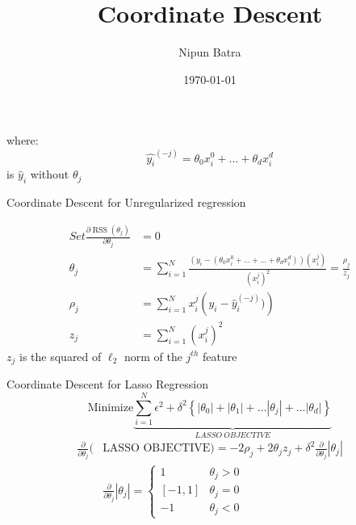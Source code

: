 \documentclass{beamer}
\title{Coordinate Descent}
\date{\today}
\author{Nipun Batra}
\institute{IIT Gandhinagar}
\begin{document}
  \maketitle


\begin{frame}where: $$\hat{y_{i}}^{(-j)} = \theta_{0} x_{i}^{0}+\ldots + \theta_{d} x_{i}^{d}$$ is $\hat{y}_{i}$ without $\theta_{j}$
\end{frame}

\begin{frame}{Coordinate Descent for Unregularized regression}

\begin{align*}
	Set \frac{\partial \operatorname{RSS}\left(\theta_{j}\right)}{\partial \theta_{j}}&= 0\\
    \theta_{j}&=\sum_{i=1}^{N} \frac{\left(y_{i}-\left(\theta_{0} x_{i}^{0}+\ldots + \ldots + \theta_{d}
    x_{i}^{d}\right)\right)\left(x_{i}^{j}\right)}{\left(x_{i}^{j}\right)^{2}}= \frac{\rho_{j}}{z_{j}}\\
    \rho_{j} &=\sum_{i=1}^{N} x_{i}^{j}\left(y_{i}-{\hat{y}_{i}^{(-j)}})\right)\\
    z_{j}&=\sum_{i=1}^{N}\left(x_{i}^{j}\right)^{2}
\end{align*}
$z_{j}$ is the squared of $\ell_2$ norm of the $j^{th}$ feature
\end{frame}

{
	
}

\begin{frame}{Coordinate Descent for Lasso Regression}
\[
  \text{Minimize} \underbrace{\sum_{i=1}^{N} \epsilon^{2} + \delta^{2}\left\{\left|\theta_{0}\right|+\left|\theta_{1}\right|+\ldots\left|\theta_{j}\right|+\ldots |\theta_{d}|\right\}}_{LASSO \: OBJECTIVE}
\]
\begin{align*}
\frac{\partial}{\partial \theta_{j}}(& \text {LASSO OBJECTIVE})=-2 \rho_{j}+2 \theta_{j} z_{j}+\delta^{2}{\frac{\partial}{\partial \theta_{j}}}\left|\theta_{j}\right|\\[18pt]
&\frac{\partial}{\partial \theta_{j}}\left|\theta_{j}\right|=\left\{\begin{array}{cc}
{1} & {\theta_{j}>0} \\
{[-1,1]} & {\theta_{j}=0} \\
{-1} & {\theta_{j}<0}
\end{array}\right.
\end{align*}
\end{frame}
\end{document}
